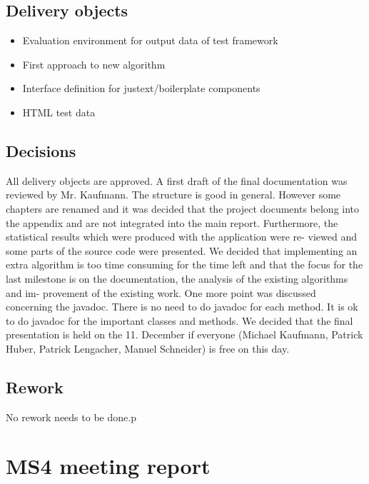 \subsection{Delivery objects}

\begin{itemize}
\item Evaluation environment for output data of test framework

\item First approach to new algorithm

\item Interface definition for justext/boilerplate components
\item HTML test data
\end{itemize}


\subsection{Decisions}

All delivery objects are approved. A first draft of the final documentation was reviewed
by Mr. Kaufmann. The structure is good in general. However some chapters are
renamed and it was decided that the project documents belong into the appendix and
are not integrated into the main report.
Furthermore, the statistical results which were produced with the application were re-
viewed and some parts of the source code were presented. We decided that implementing
an extra algorithm is too time consuming for the time left and that the focus for the
last milestone is on the documentation, the analysis of the existing algorithms and im-
provement of the existing work.
One more point was discussed concerning the javadoc. There is no need to do javadoc
for each method. It is ok to do javadoc for the important classes and methods.
We decided that the final presentation is held on the 11. December if everyone (Michael
Kaufmann, Patrick Huber, Patrick Lengacher, Manuel Schneider) is free on this day.

\subsection{Rework}

No rework needs to be done.p


\section{MS4 meeting report}

\label{ms4report}


